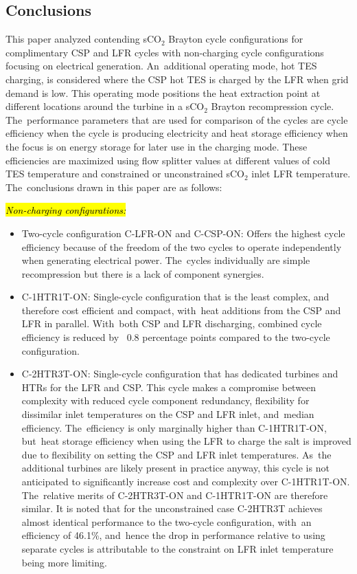 \documentclass[sustainability,article,accept,moreauthors,pdftex]{Definitions/mdpi}
\begin{document}
\begin{paracol}{2}
\section{Conclusions}

This paper analyzed contending sCO$_2$ Brayton cycle configurations for complimentary CSP and LFR cycles with non-charging cycle configurations focusing on electrical generation. An~additional operating mode, hot TES charging, is considered where the CSP hot TES is charged by the LFR when grid demand is low. This operating mode positions the heat extraction point at different locations around the turbine in a sCO$_2$ Brayton recompression cycle. The~performance parameters that are used for comparison of the cycles are cycle efficiency when the cycle is producing electricity and heat storage efficiency when the focus is on energy storage for later use in the charging mode. These efficiencies are maximized using flow splitter values at different values of cold TES temperature and constrained or unconstrained sCO$_2$ inlet LFR temperature. The~conclusions drawn in this paper are as follows:

\textit{\hl{Non-charging configurations:}}%
\begin{itemize}
    \item	Two-cycle configuration C-LFR-ON and C-CSP-ON: Offers the highest cycle efficiency because of the freedom of the two cycles to operate independently when generating electrical power. The~cycles individually are simple recompression but there is a lack of component synergies.
    \item	C-1HTR1T-ON: Single-cycle configuration that is the least complex, and therefore cost efficient and compact, with~heat additions from the CSP and LFR in parallel. With~both CSP and LFR discharging, combined cycle efficiency is reduced by ~0.8 percentage points compared to the two-cycle configuration. 
    \item   C-2HTR3T-ON: Single-cycle configuration that has dedicated turbines and HTRs for the LFR and CSP. This cycle makes a compromise between complexity with reduced cycle component redundancy, flexibility for dissimilar inlet temperatures on the CSP and LFR inlet, and~median efficiency. The~efficiency is only marginally higher than C-1HTR1T-ON, but~heat storage efficiency when using the LFR to charge the salt is improved due to flexibility on setting the CSP and LFR inlet temperatures. As~the additional turbines are likely present in practice anyway, this cycle is not anticipated to significantly increase cost and complexity over C-1HTR1T-ON. The~relative merits of C-2HTR3T-ON and C-1HTR1T-ON are therefore similar. It is noted that for the unconstrained case C-2HTR3T achieves almost identical performance to the two-cycle configuration, with~an efficiency of 46.1\%, and~hence the drop in performance relative to using separate cycles is attributable to the constraint on LFR inlet temperature being more limiting.
\end{itemize}


\end{paracol}
\end{document}

